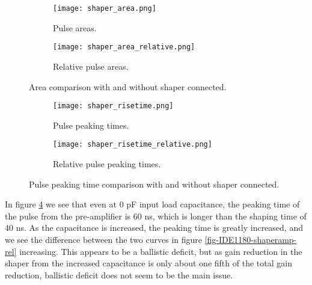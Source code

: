 \documentclass[../main/thesis.tex]{subfiles}
\begin{document}
\begin{figure}[p]
	\centering
	\begin{subfigure}{.5\textwidth}
		\centering
		\texttt{[image: shaper\_area.png]}
		\caption{Pulse areas.}
		\label{fig-IDE1180-shaperarea-}
	\end{subfigure}%
	\begin{subfigure}{.5\textwidth}
		\centering
		\texttt{[image: shaper\_area\_relative.png]}
		\caption{Relative pulse areas.}
		\label{fig-IDE1180-shaperarea-rel} 
	\end{subfigure}
	\caption{Area comparison with and without shaper connected.}
	\label{fig-IDE1180-shaperarea}
\end{figure}

\begin{figure}[p]
	\centering
	\begin{subfigure}{.5\textwidth}
		\centering
		\texttt{[image: shaper\_risetime.png]}
		\caption{Pulse peaking times.}
		\label{fig-IDE1180-shaperrisetime-}
	\end{subfigure}%
	\begin{subfigure}{.5\textwidth}
		\centering
		\texttt{[image: shaper\_risetime\_relative.png]}
		\caption{Relative pulse peaking times.}
		\label{fig-IDE1180-shaperrisetime-rel}
	\end{subfigure}
	\caption{Pulse peaking time comparison with and without shaper connected.}
	\label{fig-IDE1180-shaperrisetime}
\end{figure}

In figure \ref{fig-IDE1180-shaperrisetime-} we see that even at 0 pF input load capacitance, the peaking time of the pulse from the pre-amplifier is 60 ns, which is longer than the shaping time of 40 ns. As the capacitance is increased, the peaking time is greatly increased, and we see the difference between the two curves in figure \ref{fig-IDE1180-shaperamp-rel} increasing. This appears to be a ballistic deficit, but as gain reduction in the shaper from the increased capacitance is only about one fifth of the total gain reduction, ballistic deficit does not seem to be the main issue.  

\end{document}
